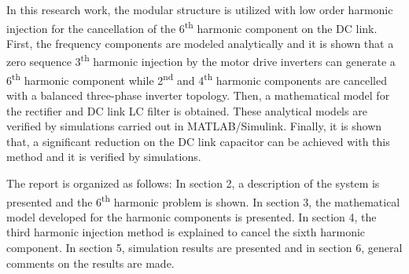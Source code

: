 In this research work, the modular structure is utilized with low order harmonic injection for the cancellation of the 6\textsuperscript{th} harmonic component on the DC link. First, the frequency components are modeled analytically and it is shown that a zero sequence 3\textsuperscript{th} harmonic injection by the motor drive inverters can generate a 6\textsuperscript{th} harmonic component while 2\textsuperscript{nd} and 4\textsuperscript{th} harmonic components are cancelled with a balanced three-phase inverter topology. Then, a mathematical model for the rectifier and DC link LC filter is obtained. These analytical models are verified by simulations carried out in MATLAB/Simulink. Finally, it is shown that, a significant reduction on the DC link capacitor can be achieved with this method and it is verified by simulations.

The report is organized as follows: In section 2, a description of the system is presented and the 6\textsuperscript{th} harmonic problem is shown. In section 3, the mathematical model developed for the harmonic components is presented. In section 4, the third harmonic injection method is explained to cancel the sixth harmonic component. In section 5, simulation results are presented and in section 6, general comments on the results are made.





